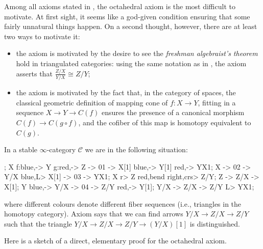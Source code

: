 \documentclass[11pt, a4paper]{amsart}
\renewcommand{\C}{\mathcal{C}}
\begin{document}
\begin{example}
Among all axioms stated in \adef {}, the octahedral axiom  is the most difficult to motivate. At first sight, it seems like a god-given condition ensuring that some fairly unnatural things happen. On a second thought, however, there are at least two ways to motivate it:
\begin{itemize}
\item the axiom is motivated by the desire to see the \emph{freshman algebraist's theorem} hold in triangulated categories: using the same notation as in , the axiom asserts that $\frac{Z/X}{Y/X}\cong Z/Y$;
\item the axiom is motivated by the fact that, in the category of spaces, the classical geometric definition of mapping cone of $f\colon X\to Y$, fitting in a sequence $X\to Y\to C(f)$ ensures the presence of a canonical morphism $C(f)\to C(g\circ f)$, and the cofiber of this map is homotopy equivalent to $C(g)$.
\end{itemize}
In a stable $\infty$-category $\C$ we are in the following situation:
\begin{center}
\begin{kD}
;
\mor X f:blue,-> Y g:red,-> Z -> 01 -> X[1] blue,-> Y[1] red,-> YX1;
\mor X -> 02 -> Y/X blue,L> X[1] -> 03 -> YX1;
\mor X r> Z red,{bend right},crs> Z/Y; \mor Z -> Z/X -> X[1];
\mor Y blue,-> Y/X -> 04 -> Z/Y red,-> Y[1];
\mor[dashed] Y/X -> Z/X -> Z/Y L> YX1;
\end{kD}
\end{center}
where different colours denote different fiber sequences (i.e., triangles in the homotopy category). Axiom  says that we can find arrows $Y/X\to Z/X\to Z/Y$  such that the triangle $Y/X\to Z/X\to Z/Y\to (Y/X)[1]$ is distinguished. 

Here is a sketch of a direct, elementary proof for the octahedral axiom.


\end{example}
\end{document}

